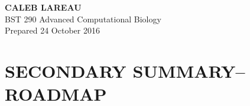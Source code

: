 \documentclass[12pt]{article}
\begin{document}
\begin{minipage}[t]{0.5\linewidth}
    \begin{flushleft}
    \textbf{
    {\huge C}{\Large ALEB} \hspace{-0.1em} 
    {\huge L}{\Large AREAU}}\\
     \hspace*{4mm} BST 290 Advanced Computational Biology \\
     \hspace*{4mm} Prepared 24 October 2016
         \end{flushleft}
\end{minipage}

 
 
\section*{\textbf{{\Large S}{\small ECONDARY} {\Large S}{\small UMMARY}{\Large --R}{\small OADMAP}}}
\end{document}
